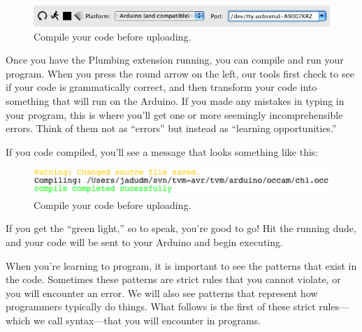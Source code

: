 \begin{figure}[ht]
  \begin{center}
    \includegraphics[width=1.0\linewidth]{screenshots/20100108-compile-button}
    \caption{Compile your code before uploading.}
    \label{screenshot:compile-button}
  \end{center}
\end{figure}

Once you have the Plumbing extension running, you can compile and run your program. When you press the round arrow on the left, our tools first check to see if your code is grammatically correct, and then transform your code into something that will run on the Arduino. If you made any mistakes in typing in your program, this is where you'll get one or more seemingly incomprehensible errors. Think of them not as ``errors'' but instead as ``learning opportunities.''
         
                                
If you code compiled, you'll see a message that looks something like this:

\begin{figure}[ht]
  \begin{center}
    \includegraphics[width=0.8\linewidth]{screenshots/20100108-compile-successful}
    \caption{Compile your code before uploading.}
    \label{screenshot:compile-successful}
  \end{center}
\end{figure}

If you get the ``green light,'' so to speak, you're good to go! Hit the running dude, and your code will be sent to your Arduino and begin executing.

\PATTERNS
When you're learning to program, it is important to see the patterns that exist in the code. Sometimes these patterns are strict rules that you cannot violate, or you will encounter an error. We will also see patterns that represent how programmers typically do things. What follows is the first of these strict rules---which we call {\strong syntax}---that you will encounter in \occam programs. 

